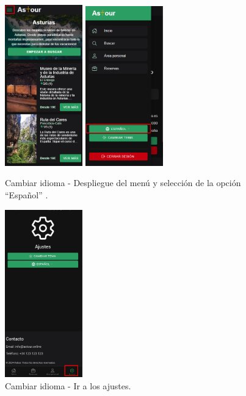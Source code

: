 \begin{figure}[H]
	\centering
	\begin{minipage}{0.45\textwidth}
		\centering
		\includegraphics[width=0.3\textwidth]{7-Construccion/Manuales/mobile/menu marcado.png}
		\includegraphics[width=0.3\textwidth]{7-Construccion/Manuales/mobile/idioma marcado.png}
		\caption{Cambiar idioma - Despliegue del menú y selección de la opción “Español” .}
		\label{fig:idioma-movil}
	\end{minipage}
	\hfill
	\begin{minipage}{0.45\textwidth}
		\centering
		\includegraphics[width=0.3\textwidth]{7-Construccion/Manuales/app/P1-Configuration.png}
		\caption {Cambiar idioma - Ir a los ajustes.}
		\label{fig:idioma-app}
	\end{minipage}
\end{figure}

